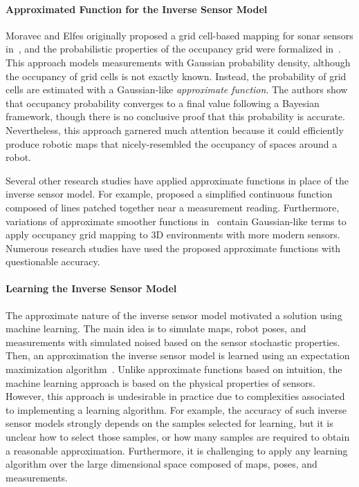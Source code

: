 \paragraph{Approximated Function for the Inverse Sensor Model} Moravec and Elfes originally proposed a grid cell-based mapping for sonar sensors in~\cite{MorElf85}, and the probabilistic properties of the occupancy grid were formalized in~\cite{MorElf85,Elf89}. This approach models measurements with Gaussian probability density, although the occupancy of grid cells is not exactly known. Instead, the probability of grid cells are estimated with a Gaussian-like \emph{approximate function}. The authors show that occupancy probability converges to a final value following a Bayesian framework, though there is no conclusive proof that this probability is accurate. Nevertheless, this approach garnered much attention because it could efficiently produce robotic maps that nicely-resembled the occupancy of spaces around a robot.

Several other research studies have applied approximate functions in place of the inverse sensor model. For example, \cite{ChoLynHutKanBurKavThr05} proposed a simplified continuous function composed of lines patched together near a measurement reading. Furthermore, variations of approximate smoother functions in~\cite{and09,PirRutBisSch11,KhoElb12} contain Gaussian-like terms to apply occupancy grid mapping to 3D environments with more modern sensors. Numerous research studies have used the proposed approximate functions with questionable accuracy.

\paragraph{Learning the Inverse Sensor Model} The approximate nature of the inverse sensor model motivated a solution using machine learning. The main idea is to simulate maps, robot poses, and measurements with simulated noised based on the sensor stochastic properties. Then, an approximation the inverse sensor model is learned using an expectation maximization algorithm~\cite{Thr01,ThrBurFox05}. Unlike approximate functions based on intuition, the machine learning approach is based on the physical properties of sensors. However, this approach is undesirable in practice due to complexities associated to implementing a learning algorithm. For example, the accuracy of such inverse sensor models strongly depends on the samples selected for learning, but it is unclear how to select those samples, or how many samples are required to obtain a reasonable approximation. Furthermore, it is challenging to apply any learning algorithm over the large dimensional space composed of maps, poses, and measurements.

